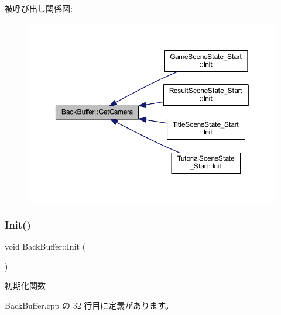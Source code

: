 被呼び出し関係図\+:\nopagebreak
\begin{figure}[H]
\begin{center}
\leavevmode
\includegraphics[width=350pt]{class_back_buffer_addd0da33667c19cfba7f1d81009486f2_icgraph}
\end{center}
\end{figure}
\mbox{\label{class_back_buffer_a65ac0a652db2a558ecda120ef3f47a10}} 
\subsubsection{\texorpdfstring{Init()}{Init()}}
{\footnotesize\ttfamily void Back\+Buffer\+::\+Init (\begin{DoxyParamCaption}{ }\end{DoxyParamCaption})}



初期化関数 



 Back\+Buffer.\+cpp の 32 行目に定義があります。

